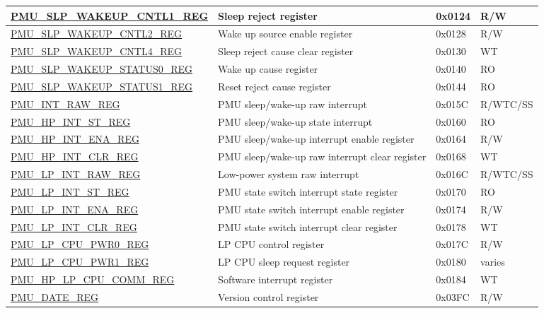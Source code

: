 \begin{longtable}{ | l | p{6cm} | p{1.3cm} | p{1.5cm} | }
\hyperref[regdesc:PMUSLPWAKEUPCNTL1REG]{PMU\_SLP\_WAKEUP\_CNTL1\_REG} & Sleep reject register & 0x0124 & R/W \\ \hline
\hyperref[regdesc:PMUSLPWAKEUPCNTL2REG]{PMU\_SLP\_WAKEUP\_CNTL2\_REG} & Wake up source enable register & 0x0128 & R/W \\ \hline
\hyperref[regdesc:PMUSLPWAKEUPCNTL4REG]{PMU\_SLP\_WAKEUP\_CNTL4\_REG} & Sleep reject cause clear register & 0x0130 & WT \\ \hline
\hyperref[regdesc:PMUSLPWAKEUPSTATUS0REG]{PMU\_SLP\_WAKEUP\_STATUS0\_REG} & Wake up cause register & 0x0140 & RO \\ \hline
\hyperref[regdesc:PMUSLPWAKEUPSTATUS1REG]{PMU\_SLP\_WAKEUP\_STATUS1\_REG} & Reset reject cause register & 0x0144 & RO \\ \hline
\hyperref[regdesc:PMUINTRAWREG]{PMU\_INT\_RAW\_REG} & PMU sleep/wake-up raw interrupt & 0x015C & R/WTC/SS \\ \hline
\hyperref[regdesc:PMUHPINTSTREG]{PMU\_HP\_INT\_ST\_REG} & PMU sleep/wake-up state interrupt & 0x0160 & RO \\ \hline
\hyperref[regdesc:PMUHPINTENAREG]{PMU\_HP\_INT\_ENA\_REG} & PMU sleep/wake-up interrupt enable register & 0x0164 & R/W \\ \hline
\hyperref[regdesc:PMUHPINTCLRREG]{PMU\_HP\_INT\_CLR\_REG} & PMU sleep/wake-up raw interrupt clear register & 0x0168 & WT \\ \hline
\hyperref[regdesc:PMULPINTRAWREG]{PMU\_LP\_INT\_RAW\_REG} & Low-power system raw interrupt & 0x016C & R/WTC/SS \\ \hline
\hyperref[regdesc:PMULPINTSTREG]{PMU\_LP\_INT\_ST\_REG} & PMU state switch interrupt state register & 0x0170 & RO \\ \hline
\hyperref[regdesc:PMULPINTENAREG]{PMU\_LP\_INT\_ENA\_REG} & PMU state switch interrupt enable register & 0x0174 & R/W \\ \hline
\hyperref[regdesc:PMULPINTCLRREG]{PMU\_LP\_INT\_CLR\_REG} & PMU state switch interrupt clear register & 0x0178 & WT \\ \hline
\hyperref[regdesc:PMULPCPUPWR0REG]{PMU\_LP\_CPU\_PWR0\_REG} & LP CPU control register & 0x017C & R/W \\ \hline
\hyperref[regdesc:PMULPCPUPWR1REG]{PMU\_LP\_CPU\_PWR1\_REG} & LP CPU sleep request register & 0x0180 & varies \\ \hline
\hyperref[regdesc:PMUHPLPCPUCOMMREG]{PMU\_HP\_LP\_CPU\_COMM\_REG} & Software interrupt register & 0x0184 & WT \\ \hline
\hyperref[regdesc:PMUDATEREG]{PMU\_DATE\_REG} & Version control register & 0x03FC & R/W \\ \hline
\end{longtable}
